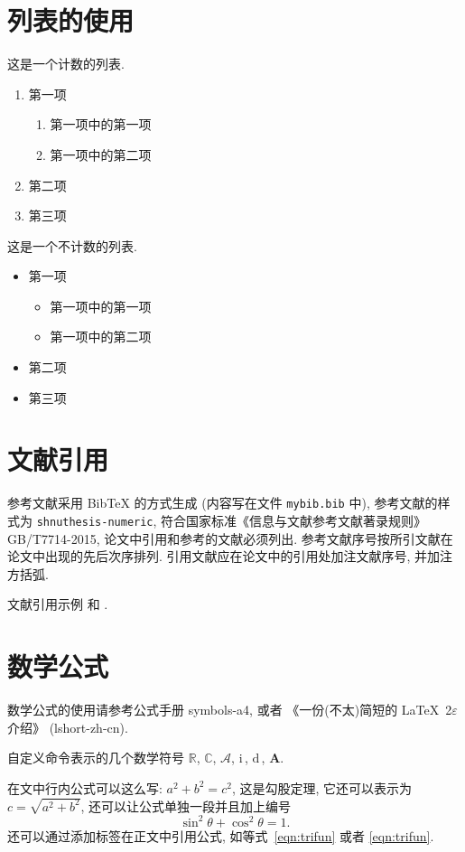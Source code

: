 \documentclass[master,print]{shnuthesis}
\newcommand{\CC}{\ensuremath{\mathbb{C}}}
\newcommand{\RR}{\ensuremath{\mathbb{R}}}
\newcommand{\A}{\mathcal{A}}
\newcommand{\ii}{\mathrm{i}\,}  %
\newcommand{\md}{\mathrm{d}\,}
\newcommand{\bA}{\boldsymbol{A}}
\begin{document}
\section{列表的使用}

这是一个计数的列表.
\begin{enumerate}%
	\item 第一项
		\begin{enumerate}
			\item 第一项中的第一项
			\item 第一项中的第二项
		\end{enumerate}
	\item 第二项
	\item 第三项
\end{enumerate}

这是一个不计数的列表.
\begin{itemize}%
	\item 第一项
	\begin{itemize}
		\item 第一项中的第一项
		\item 第一项中的第二项
	\end{itemize}
	\item 第二项
	\item 第三项
\end{itemize}


\section{文献引用}

参考文献采用 BibTeX 的方式生成 (内容写在文件 \verb|mybib.bib| 中), 参考文献的样式为 \verb|shnuthesis-numeric|, 符合国家标准《信息与文献参考文献著录规则》GB/T7714-2015, 论文中引用和参考的文献必须列出. 参考文献序号按所引文献在论文中出现的先后次序排列. 引用文献应在论文中的引用处加注文献序号, 并加注方括弧.

文献引用示例 \cite{LiLiu1997} 和 \cite{Adams2003,Shen1994}.


\section{数学公式}

数学公式的使用请参考公式手册 symbols-a4, 或者 《一份(不太)简短的 \LaTeX~2$\varepsilon$ 介绍》 (lshort-zh-cn).

自定义命令表示的几个数学符号 $\RR$, $\CC$, $\A$, $\ii$, $\md$, $\bA$.

在文中行内公式可以这么写: $a^2+b^2=c^2$, 这是勾股定理, 它还可以表示为 $c=\sqrt{a^2+b^2}$, 还可以让公式单独一段并且加上编号
\begin{equation}\label{eqn:trifun}
\sin^2{\theta}+\cos^2{\theta}=1.
\end{equation}
还可以通过添加标签在正文中引用公式, 如等式~\eqref{eqn:trifun} 或者 \ref{eqn:trifun}.
\end{document}
